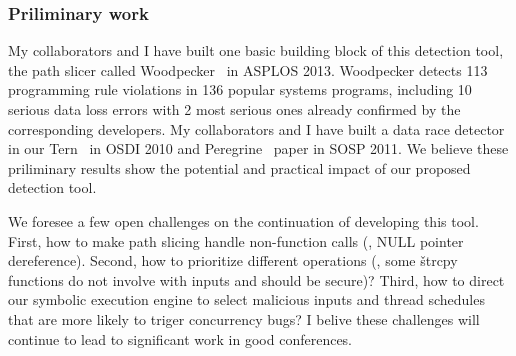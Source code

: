 



 

\subsubsection{Priliminary work}\label{sec:detect-result}

My collaborators and I have built one basic building block of this detection 
tool, the path slicer called Woodpecker~\cite{woodpecker:asplos13} in ASPLOS 
2013. Woodpecker detects 113 programming rule violations in 136 popular systems 
programs, including 10 serious data loss errors with 2 most serious ones 
already confirmed by the corresponding developers. My collaborators and I have 
built a data race detector in our Tern~\cite{cui:tern:osdi10} in OSDI 2010 and 
Peregrine~\cite{peregrine:sosp11} paper in SOSP 2011. We believe these 
priliminary results show the potential and practical impact of our proposed 
detection tool.



We foresee a few open challenges on the continuation of developing this tool. 
First, how to make path slicing handle non-function calls (\eg, NULL pointer 
dereference). Second, how to prioritize different operations (\eg, some 
\v{strcpy} functions do not involve with inputs and should be secure)? Third, 
how to direct our symbolic execution engine to select malicious inputs and 
thread schedules that are more likely to triger concurrency bugs? I belive 
these challenges will continue to lead to significant work in good conferences.

